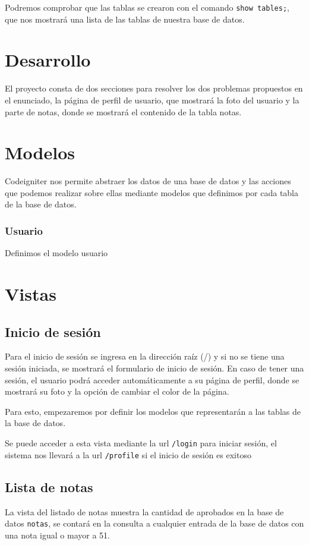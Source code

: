 \documentclass[letter]{article}
\begin{document}
Podremos comprobar que las tablas se crearon con el comando \texttt{show tables;}, que
nos mostrará una lista de las tablas de nuestra base de datos.

\section{Desarrollo}
\label{sec:org253a68e}
El proyecto consta de dos secciones para resolver los dos problemas propuestos
en el enunciado, la página de perfil de usuario, que mostrará la foto del
usuario y la parte de notas, donde se mostrará el contenido de la tabla notas.

\section{Modelos}
\label{sec:org7c84e5c}
Codeigniter nos permite abstraer los datos de una base de datos y las acciones
que podemos realizar sobre ellas mediante modelos que definimos por cada tabla
de la base de datos.

\subsubsection{Usuario}
\label{sec:orgccdf1f8}
Definimos el modelo usuario

\section{Vistas}
\label{sec:org27f04d3}
\subsection{Inicio de sesión}
\label{sec:org7e017dc}
Para el inicio de sesión se ingresa en la dirección raíz (/) y si no se tiene
una sesión iniciada, se mostrará el formulario de inicio de sesión. En caso de
tener una sesión, el usuario podrá acceder automáticamente a su página de
perfil, donde se mostrará su foto y la opción de cambiar el color de la página.

Para esto, empezaremos por definir los modelos que representarán a las tablas de
la base de datos.

Se puede acceder a esta vista mediante la url \texttt{/login} para iniciar sesión, el
sistema nos llevará a la url \texttt{/profile} si el inicio de sesión es exitoso

\subsection{Lista de notas}
\label{sec:orgd5e01d5}
La vista del listado de notas muestra la cantidad de aprobados en la base de
datos \texttt{notas}, se contará en la consulta a cualquier entrada de la base de datos
con una nota igual o mayor a 51.
\end{document}
